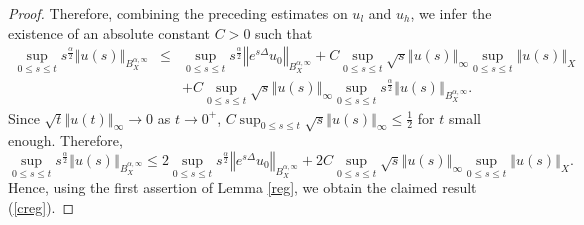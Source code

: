 \documentclass[11pt]{amsart}%
\theoremstyle{plain}
\numberwithin{equation}{section}
\begin{document}
\begin{proof}
Therefore, combining the preceding estimates on $u_l$ and $u_h$, we infer the existence of an absolute constant $C>0$ such that
\begin{eqnarray*}
\sup_{0\leq s\leq t}s^\frac{\alpha}{2}\left\Vert u(s)\right\Vert_{B^{\alpha,\infty}_X}&\leq &\sup_{0\leq s\leq t}s^\frac{\alpha}{2}\left\Vert e^{s\Delta}u_0\right\Vert_{B^{\alpha,\infty}_X}+ C\sup_{0\leq s\leq t}\sqrt{s}\left\Vert u(s)\right\Vert_\infty \sup_{0\leq s\leq t}\left\Vert u(s)\right\Vert_X\\
& & + C \sup_{0\leq s\leq t}\sqrt{s}\left\Vert u(s)\right\Vert_\infty \sup_{0\leq s\leq t}s^\frac{\alpha}{2}\left\Vert u(s)\right\Vert_{B^{\alpha,\infty}_X}.
\end{eqnarray*}
Since $\sqrt{t}\left\Vert u(t)\right\Vert_\infty\to0$ as $t\to 0^+$, $ C \sup_{0\leq s\leq t}\sqrt{s}\left\Vert u(s)\right\Vert_\infty \leq \frac{1}{2}$ for $t$ small enough. Therefore,
\[\sup_{0\leq s\leq t}s^\frac{\alpha}{2}\left\Vert u(s)\right\Vert_{B^{\alpha,\infty}_X}\leq 2 \sup_{0\leq s\leq t}s^\frac{\alpha}{2}\left\Vert e^{s\Delta}u_0\right\Vert_{B^{\alpha,\infty}_X}+ 2C \sup_{0\leq s\leq t}\sqrt{s}\left\Vert u(s)\right\Vert_\infty \sup_{0\leq s\leq t}\left\Vert u(s)\right\Vert_X.
\]
Hence, using the first assertion of Lemma \ref{reg}, we obtain the claimed result (\ref{creg}).
\end{proof}
\end{document}
